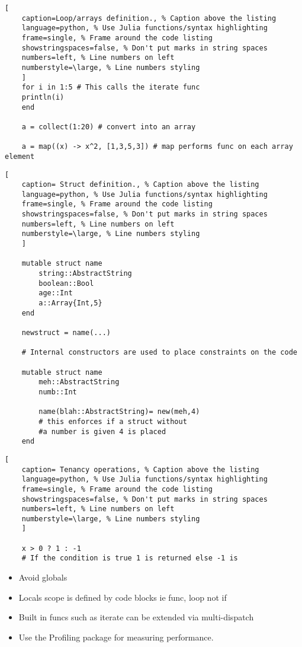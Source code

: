 \documentclass[11pt]{scrartcl} %
\begin{document}
\begin{lstlisting}[
	caption=Loop/arrays definition., % Caption above the listing
	language=python, % Use Julia functions/syntax highlighting
	frame=single, % Frame around the code listing
	showstringspaces=false, % Don't put marks in string spaces
	numbers=left, % Line numbers on left
	numberstyle=\large, % Line numbers styling
	]	
	for i in 1:5 # This calls the iterate func
	println(i)
	end

	a = collect(1:20) # convert into an array

	a = map((x) -> x^2, [1,3,5,3]) # map performs func on each array element

\end{lstlisting}

\begin{lstlisting}[
	caption= Struct definition., % Caption above the listing
	language=python, % Use Julia functions/syntax highlighting
	frame=single, % Frame around the code listing
	showstringspaces=false, % Don't put marks in string spaces
	numbers=left, % Line numbers on left
	numberstyle=\large, % Line numbers styling
	]	
	
	mutable struct name 
		string::AbstractString
		boolean::Bool 
		age::Int
		a::Array{Int,5}
	end

	newstruct = name(...)

	# Internal constructors are used to place constraints on the code

	mutable struct name
		meh::AbstractString
		numb::Int

		name(blah::AbstractString)= new(meh,4) 
		# this enforces if a struct without 
		#a number is given 4 is placed
	end

\end{lstlisting}

\begin{lstlisting}[
	caption= Tenancy operations, % Caption above the listing
	language=python, % Use Julia functions/syntax highlighting
	frame=single, % Frame around the code listing
	showstringspaces=false, % Don't put marks in string spaces
	numbers=left, % Line numbers on left
	numberstyle=\large, % Line numbers styling
	]

	x > 0 ? 1 : -1 
	# If the condition is true 1 is returned else -1 is

\end{lstlisting}

\begin{itemize}
	\item Avoid globals
	\item Locals scope is defined by code blocks ie func, loop not if
	\item Built in funcs such as iterate can be extended via multi-dispatch
	\item Use the Profiling package for measuring performance.
\end{itemize}
\end{document}
